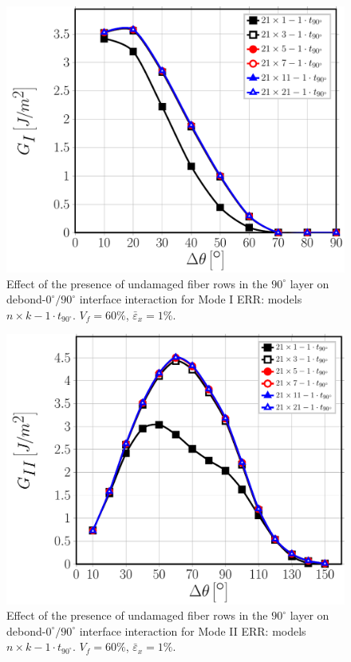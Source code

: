 \documentclass[review]{elsarticle}
\begin{document}
\begin{figure}[!htb]
\centering
\includegraphics[height=0.375\textheight]{nxk-1-vf60-GI.pdf}
\caption{Effect of the presence of undamaged fiber rows in the $90^{\circ}$ layer on debond-$0^{\circ}/90^{\circ}$ interface interaction for Mode I ERR: models $n\times k-1\cdot t_{90^{\circ}}$. $V_{f}=60\%$, $\bar{\varepsilon}_{x}=1\%$.}\label{fig:nkGI}
\end{figure}

\begin{figure}[!htb]
\centering
\includegraphics[height=0.375\textheight]{nxk-1-vf60-GII.pdf}
\caption{Effect of the presence of undamaged fiber rows in the $90^{\circ}$ layer on debond-$0^{\circ}/90^{\circ}$ interface interaction for Mode II ERR: models $n\times k-1\cdot t_{90^{\circ}}$. $V_{f}=60\%$, $\bar{\varepsilon}_{x}=1\%$.}\label{fig:nkGII}
\end{figure}
\end{document}
